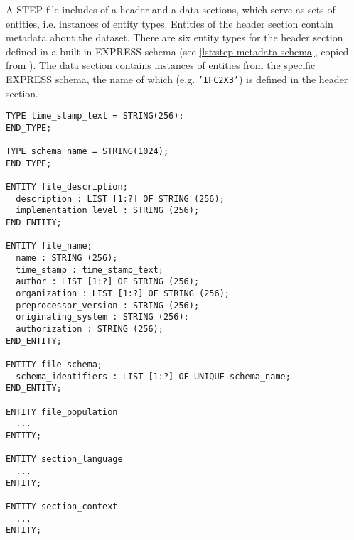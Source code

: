 
A STEP-file includes of a header and a data sections, which serve as sets of entities, i.e. instances of entity types.
Entities of the header section contain metadata about the dataset.
There are six entity types for the header section defined in a built-in EXPRESS schema (see \autoref{lst:step-metadata-schema}, copied from \cite{hafele2008ifcheader}).
The data section contains instances of entities from the specific EXPRESS schema, the name of which (e.g. \texttt{'IFC2X3'}) is defined in the header section.


\begin{lstlisting}[caption={The built-in EXPRESS schema for STEP metadata},label=lst:step-metadata-schema]
TYPE time_stamp_text = STRING(256);
END_TYPE;

TYPE schema_name = STRING(1024);
END_TYPE;

ENTITY file_description;
  description : LIST [1:?] OF STRING (256);
  implementation_level : STRING (256);
END_ENTITY;

ENTITY file_name;
  name : STRING (256);
  time_stamp : time_stamp_text;
  author : LIST [1:?] OF STRING (256);
  organization : LIST [1:?] OF STRING (256);
  preprocessor_version : STRING (256);
  originating_system : STRING (256);
  authorization : STRING (256);
END_ENTITY;

ENTITY file_schema;
  schema_identifiers : LIST [1:?] OF UNIQUE schema_name;
END_ENTITY;

ENTITY file_population
  ...
ENTITY;

ENTITY section_language
  ...
ENTITY;

ENTITY section_context
  ...
ENTITY;
\end{lstlisting}


